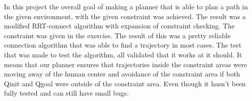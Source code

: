 In this project the overall goal of making a planner that is able to plan a path in the given environment, with the given constraint was achieved. The result was a modified RRT-connect algorithm with expansion of constraint checking. The constraint was given in the exercise. The result of this was a pretty reliable connection algorithm that was able to find a trajectory in most cases. The test that was made to test the algorithm, all validated that it works at it should. It means that our planner ensures that trajectories inside the constraint areas were moving away of the human center and avoidance of the constraint area if both Qinit and Qgoal were outside of the constraint area. Even though it hasn't been fully tested and can still have small bugs.